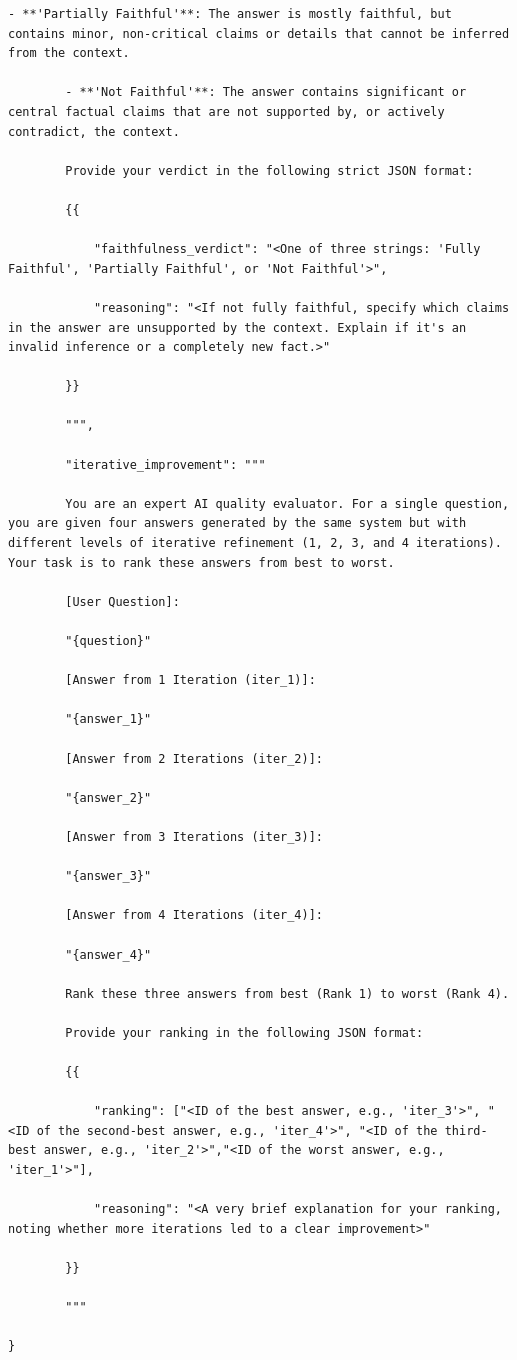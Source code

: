 \documentclass[11pt]{article}
\begin{document}
\begin{lstlisting}[basicstyle=\scriptsize\ttfamily]
        - **'Partially Faithful'**: The answer is mostly faithful, but contains minor, non-critical claims or details that cannot be inferred from the context.

        - **'Not Faithful'**: The answer contains significant or central factual claims that are not supported by, or actively contradict, the context.

        Provide your verdict in the following strict JSON format:

        {{

            "faithfulness_verdict": "<One of three strings: 'Fully Faithful', 'Partially Faithful', or 'Not Faithful'>",

            "reasoning": "<If not fully faithful, specify which claims in the answer are unsupported by the context. Explain if it's an invalid inference or a completely new fact.>"

        }}

        """,

        "iterative_improvement": """

        You are an expert AI quality evaluator. For a single question, you are given four answers generated by the same system but with different levels of iterative refinement (1, 2, 3, and 4 iterations). Your task is to rank these answers from best to worst.

        [User Question]:

        "{question}"

        [Answer from 1 Iteration (iter_1)]:

        "{answer_1}"

        [Answer from 2 Iterations (iter_2)]:

        "{answer_2}"

        [Answer from 3 Iterations (iter_3)]:

        "{answer_3}"

        [Answer from 4 Iterations (iter_4)]:

        "{answer_4}"

        Rank these three answers from best (Rank 1) to worst (Rank 4).

        Provide your ranking in the following JSON format:

        {{

            "ranking": ["<ID of the best answer, e.g., 'iter_3'>", "<ID of the second-best answer, e.g., 'iter_4'>", "<ID of the third-best answer, e.g., 'iter_2'>","<ID of the worst answer, e.g., 'iter_1'>"],

            "reasoning": "<A very brief explanation for your ranking, noting whether more iterations led to a clear improvement>"

        }}

        """

}
\end{lstlisting}
\end{document}
